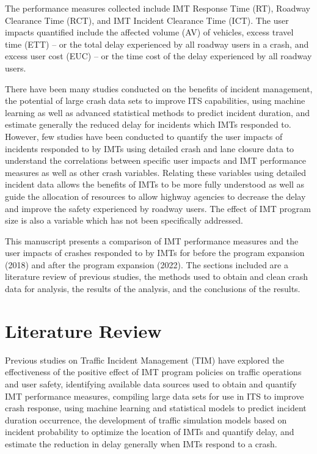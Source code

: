 \documentclass[
  letterpaper,
  authoryear]{elsarticle}
\begin{document}
The performance measures collected include IMT Response Time (RT),
Roadway Clearance Time (RCT), and IMT Incident Clearance Time (ICT). The
user impacts quantified include the affected volume (AV) of vehicles,
excess travel time (ETT) -- or the total delay experienced by all
roadway users in a crash, and excess user cost (EUC) -- or the time cost
of the delay experienced by all roadway users.

There have been many studies conducted on the benefits of incident
management, the potential of large crash data sets to improve ITS
capabilities, using machine learning as well as advanced statistical
methods to predict incident duration, and estimate generally the reduced
delay for incidents which IMTs responded to. However, few studies have
been conducted to quantify the user impacts of incidents responded to by
IMTs using detailed crash and lane closure data to understand the
correlations between specific user impacts and IMT performance measures
as well as other crash variables. Relating these variables using
detailed incident data allows the benefits of IMTs to be more fully
understood as well as guide the allocation of resources to allow highway
agencies to decrease the delay and improve the safety experienced by
roadway users. The effect of IMT program size is also a variable which
has not been specifically addressed.

This manuscript presents a comparison of IMT performance measures and
the user impacts of crashes responded to by IMTs for before the program
expansion (2018) and after the program expansion (2022). The sections
included are a literature review of previous studies, the methods used
to obtain and clean crash data for analysis, the results of the
analysis, and the conclusions of the results.


\section{Literature Review}\label{literature-review}

Previous studies on Traffic Incident Management (TIM) have explored the
effectiveness of the positive effect of IMT program policies on traffic
operations and user safety, identifying available data sources used to
obtain and quantify IMT performance measures, compiling large data sets
for use in ITS to improve crash response, using machine learning and
statistical models to predict incident duration occurrence, the
development of traffic simulation models based on incident probability
to optimize the location of IMTs and quantify delay, and estimate the
reduction in delay generally when IMTs respond to a crash.
\end{document}
